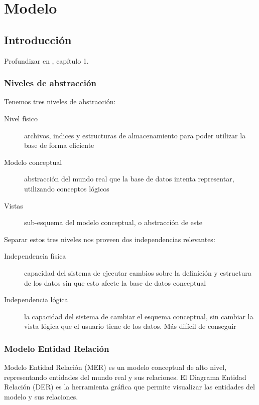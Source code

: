 \chapter{Modelo}

\section{Introducción}

Profundizar en \cite{molina2009}, capítulo 1.

\subsection{Niveles de abstracción}

Tenemos tres niveles de abstracción:

\begin{description}
	\item[Nivel físico] archivos, indices y estructuras de almacenamiento para poder utilizar la base de forma eficiente
	\item[Modelo conceptual] abstracción del mundo real que la base de datos intenta representar, utilizando conceptos lógicos
	\item[Vistas] sub-esquema del modelo conceptual, o abstracción de este
\end{description}

Separar estos tres niveles nos proveen dos independencias relevantes:

\begin{description}
	\item[Independencia física] capacidad del sistema de ejecutar cambios sobre la definición y estructura de los datos sin que esto afecte la base de datos conceptual
	\item[Independencia lógica] la capacidad del sistema de
cambiar el esquema conceptual, sin cambiar la vista
lógica que el usuario tiene de los datos. Más difícil de conseguir
\end{description}

\subsection{Modelo Entidad Relación}

Modelo Entidad Relación (MER) es un modelo conceptual de alto nivel, representando entidades del mundo real y sus relaciones. El Diagrama Entidad Relación (DER) es la herramienta
gráfica que permite visualizar las entidades del modelo y
sus relaciones.

